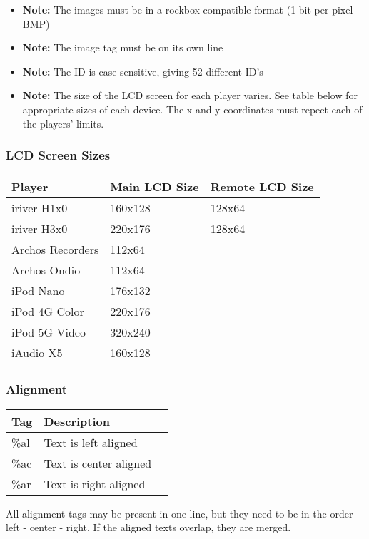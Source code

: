 \begin{itemize}
\item \textbf{Note:} The images must be in a rockbox compatible format (1 bit per pixel BMP)
\item \textbf{Note:} The image tag must be on its own line
\item \textbf{Note:} The ID is case sensitive, giving 52 different ID's
\item \textbf{Note:} The size of the LCD screen for each player varies. See table below for appropriate sizes of each device. The x and y coordinates must repect each of the players' limits.
\end{itemize}

\subsubsection{LCD Screen Sizes}

\begin{center}
  \begin{tabular}{@{}lll@{}}\toprule
    \textbf{Player} & \textbf{Main LCD Size} & \textbf{Remote LCD Size}\\\midrule
    iriver H1x0 & 160x128 & 128x64\\
    iriver H3x0 & 220x176 & 128x64\\
    Archos Recorders & 112x64 & \\ 
    Archos Ondio & 112x64 & \\
    iPod Nano & 176x132 & \\
    iPod 4G Color & 220x176 & \\
    iPod 5G Video & 320x240 & \\
    iAudio X5 & 160x128 & \\\bottomrule
  \end{tabular}
\end{center}

\subsubsection{Alignment}

\begin{center}
  \begin{tabular}{@{}lll@{}}\toprule
    \textbf{Tag} & \textbf{Description}\\\midrule
    \%al & Text is left aligned\\
    \%ac & Text is center aligned\\
    \%ar & Text is right aligned\\\bottomrule
  \end{tabular}
\end{center}
All alignment tags may be present in one line, but they need to be in the order left - center - right. If the aligned texts overlap, they are merged.

